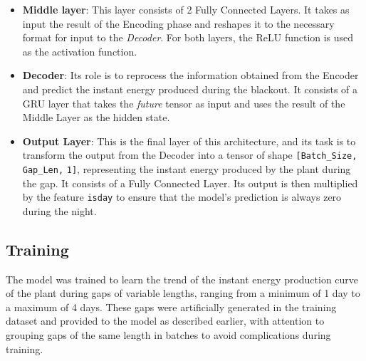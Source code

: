 \begin{itemize}
	\item \textbf{Middle layer}: This layer consists of 2 Fully Connected Layers. It takes as input the result of the Encoding phase and reshapes it to the necessary format for input to the \textit{Decoder}. For both layers, the ReLU\cite{functions} function is used as the activation function.

	\item \textbf{Decoder}: Its role is to reprocess the information obtained from the Encoder and predict the instant energy produced during the blackout. It consists of a GRU layer that takes the \textit{future} tensor as input and uses the result of the Middle Layer as the hidden state.

	\item \textbf{Output Layer}: This is the final layer of this architecture, and its task is to transform the output from the Decoder into a tensor of shape \verb|[Batch_Size,| \verb|Gap_Len,| \verb|1]|, representing the instant energy produced by the plant during the gap. It consists of a Fully Connected Layer. Its output is then multiplied by the feature \verb|isday| to ensure that the model's prediction is always zero during the night.
\end{itemize}
\subsection{Training}
The model was trained to learn the trend of the instant energy production curve of
the plant during gaps of variable lengths, ranging from a minimum of 1
day to a maximum of 4 days.
These gaps were artificially generated in the training dataset and provided to the model
as described earlier, with attention to grouping gaps of the same length in
batches to avoid complications during training.

